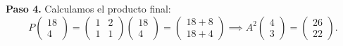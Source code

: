 \begin{prob}
\begin{myproof}
\textbf{Paso 4.} Calculamos el producto final:
\[
P \begin{pmatrix} 18 \\ 4 \end{pmatrix} = \begin{pmatrix} 1 & 2 \\ 1 & 1 \end{pmatrix} \begin{pmatrix} 18 \\ 4 \end{pmatrix} = \begin{pmatrix} 18 + 8 \\ 18 + 4 \end{pmatrix} \implies \boxed{A^2\begin{pmatrix} 4 \\ 3 \end{pmatrix} = \begin{pmatrix} 26 \\ 22 \end{pmatrix}.}
\]
\end{myproof}
\end{prob}

